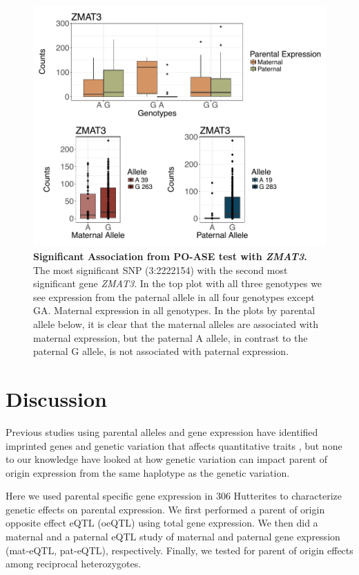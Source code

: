 \begin{figure}[!htb]
\centering \includegraphics[width=5in]{img/ch04/ZMAT3.pdf}
\caption[Significant Association from PO-ASE test with \emph{ZMAT3}.]{\textbf{Significant Association from PO-ASE test with \emph{ZMAT3}.} The most significant SNP (3:2222154) with the second most significant gene \emph{ZMAT3}. In the top plot with all three genotypes we see expression from the paternal allele in all four genotypes except GA. Maternal expression in all genotypes. In the plots by parental allele below, it is clear that the maternal alleles are associated with maternal expression, but the paternal A allele, in contrast to the paternal G allele, is not associated with paternal expression.}
\label{fig:ZMAT3}
\end{figure}
\clearpage


\section{Discussion}\label{ch04-discussion}

Previous studies using parental alleles and gene expression have identified imprinted genes and genetic variation that affects quantitative traits \cite{Zoledziewska:2015do,Baran:2015cx,Benonisdottir:2016dz,Garg2012a}, but none to our knowledge have looked at how genetic variation can impact parent of origin expression from the same haplotype as the genetic variation.

Here we used parental specific gene expression in 306 Hutterites to characterize genetic effects on parental expression. We first performed a parent of origin opposite effect eQTL (oeQTL) using total gene expression. We then did a maternal and a paternal eQTL study of maternal and paternal gene expression (mat-eQTL, pat-eQTL), respectively. Finally, we tested for parent of origin effects among reciprocal heterozygotes.

